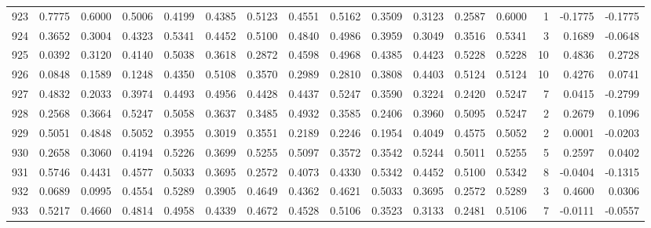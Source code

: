 \begin{tabular}{lrrrrrrrrrrrrrrr}
923 &      0.7775 &  0.6000 &  0.5006 &  0.4199 &  0.4385 &  0.5123 &  0.4551 &  0.5162 &  0.3509 &  0.3123 &   0.2587 &     0.6000 &      1 &                   -0.1775 &                    -0.1775 \\
924 &      0.3652 &  0.3004 &  0.4323 &  0.5341 &  0.4452 &  0.5100 &  0.4840 &  0.4986 &  0.3959 &  0.3049 &   0.3516 &     0.5341 &      3 &                    0.1689 &                    -0.0648 \\
925 &      0.0392 &  0.3120 &  0.4140 &  0.5038 &  0.3618 &  0.2872 &  0.4598 &  0.4968 &  0.4385 &  0.4423 &   0.5228 &     0.5228 &     10 &                    0.4836 &                     0.2728 \\
926 &      0.0848 &  0.1589 &  0.1248 &  0.4350 &  0.5108 &  0.3570 &  0.2989 &  0.2810 &  0.3808 &  0.4403 &   0.5124 &     0.5124 &     10 &                    0.4276 &                     0.0741 \\
927 &      0.4832 &  0.2033 &  0.3974 &  0.4493 &  0.4956 &  0.4428 &  0.4437 &  0.5247 &  0.3590 &  0.3224 &   0.2420 &     0.5247 &      7 &                    0.0415 &                    -0.2799 \\
928 &      0.2568 &  0.3664 &  0.5247 &  0.5058 &  0.3637 &  0.3485 &  0.4932 &  0.3585 &  0.2406 &  0.3960 &   0.5095 &     0.5247 &      2 &                    0.2679 &                     0.1096 \\
929 &      0.5051 &  0.4848 &  0.5052 &  0.3955 &  0.3019 &  0.3551 &  0.2189 &  0.2246 &  0.1954 &  0.4049 &   0.4575 &     0.5052 &      2 &                    0.0001 &                    -0.0203 \\
930 &      0.2658 &  0.3060 &  0.4194 &  0.5226 &  0.3699 &  0.5255 &  0.5097 &  0.3572 &  0.3542 &  0.5244 &   0.5011 &     0.5255 &      5 &                    0.2597 &                     0.0402 \\
931 &      0.5746 &  0.4431 &  0.4577 &  0.5033 &  0.3695 &  0.2572 &  0.4073 &  0.4330 &  0.5342 &  0.4452 &   0.5100 &     0.5342 &      8 &                   -0.0404 &                    -0.1315 \\
932 &      0.0689 &  0.0995 &  0.4554 &  0.5289 &  0.3905 &  0.4649 &  0.4362 &  0.4621 &  0.5033 &  0.3695 &   0.2572 &     0.5289 &      3 &                    0.4600 &                     0.0306 \\
933 &      0.5217 &  0.4660 &  0.4814 &  0.4958 &  0.4339 &  0.4672 &  0.4528 &  0.5106 &  0.3523 &  0.3133 &   0.2481 &     0.5106 &      7 &                   -0.0111 &                    -0.0557 \\

\end{tabular}
